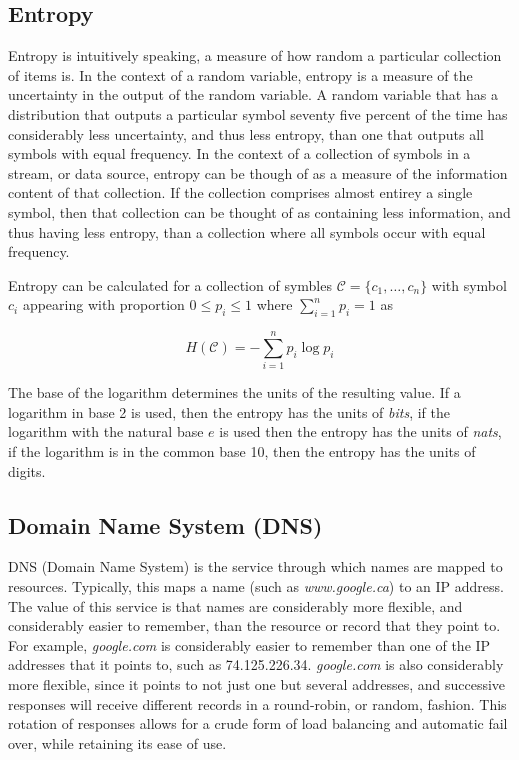 \documentclass[12pt]{article}
\theoremstyle{remark}
\theoremstyle{definition}
\theoremstyle{definition}
\theoremstyle{definition}
\begin{document}
\subsection{Entropy}
Entropy is intuitively speaking, a measure of how random a particular collection of items is. In the context of a random variable, entropy is a measure of the uncertainty in the output of the random variable. A random variable that has a distribution that outputs a particular symbol seventy five percent of the time has considerably less uncertainty, and thus less entropy, than one that outputs all symbols with equal frequency. In the context of a collection of symbols in a stream, or data source, entropy can be though of as a measure of the information content of that collection. If the collection comprises almost entirey a single symbol, then that collection can be thought of as containing less information, and thus having less entropy, than a collection where all symbols occur with equal frequency.

Entropy can be calculated for a collection of symbles $\mathcal{C}=\{c_1,\ldots,c_n\}$ with symbol $c_i$ appearing with proportion $0\leq p_i\leq 1$ where $\sum_{i=1}^n{p_i}=1$ as

 \[H(\mathcal{C})=-\sum_{i=1}^n{p_i \log{p_i}}\]

The base of the logarithm determines the units of the resulting value. If a logarithm in base 2 is used, then the entropy has the units of \emph{bits}, if the logarithm with the natural base $e$ is used then the entropy has the units of \emph{nats}, if the logarithm is in the common base 10, then the entropy has the units of digits.

\subsection{Domain Name System (DNS)}

DNS (Domain Name System) is the service through which names are mapped to
resources. Typically, this maps a name (such as \emph{www.google.ca}) to an IP
address. The value of this service is that names are considerably more
flexible, and considerably easier to remember, than the resource or record that
they point to. For example, \emph{google.com} is considerably
easier to remember than one of the IP addresses that it points to, such as
74.125.226.34. \emph{google.com} is also considerably more flexible, since it
points to not just one but several addresses, and successive responses
will receive different records in a round-robin, or random, fashion. This
rotation of responses allows for a crude form of load balancing and automatic
fail over, while retaining its ease of use.
\end{document}
